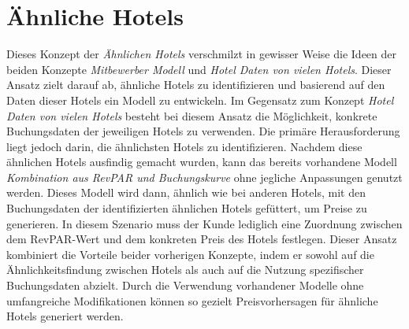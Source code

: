 \section{Ähnliche Hotels}
\label{sec:aehnliche_hotels}
Dieses Konzept der \emph{Ähnlichen Hotels} verschmilzt in gewisser Weise die Ideen der beiden Konzepte \emph{Mitbewerber Modell} und \emph{Hotel Daten von vielen Hotels}. Dieser Ansatz zielt darauf ab, ähnliche Hotels zu identifizieren und basierend auf den Daten dieser Hotels ein Modell zu entwickeln.
\newline
\newline
Im Gegensatz zum Konzept \emph{Hotel Daten von vielen Hotels} besteht bei diesem Ansatz die Möglichkeit, konkrete Buchungsdaten der jeweiligen Hotels zu verwenden. Die primäre Herausforderung liegt jedoch darin, die ähnlichsten Hotels zu identifizieren. Nachdem diese ähnlichen Hotels ausfindig gemacht wurden, kann das bereits vorhandene Modell \emph{Kombination aus RevPAR und Buchungskurve} ohne jegliche Anpassungen genutzt werden.
\newline
\newline
Dieses Modell wird dann, ähnlich wie bei anderen Hotels, mit den Buchungsdaten der identifizierten ähnlichen Hotels gefüttert, um Preise zu generieren. In diesem Szenario muss der Kunde lediglich eine Zuordnung zwischen dem RevPAR-Wert und dem konkreten Preis des Hotels festlegen.
\newline
\newline
Dieser Ansatz kombiniert die Vorteile beider vorherigen Konzepte, indem er sowohl auf die Ähnlichkeitsfindung zwischen Hotels als auch auf die Nutzung spezifischer Buchungsdaten abzielt. Durch die Verwendung vorhandener Modelle ohne umfangreiche Modifikationen können so gezielt Preisvorhersagen für ähnliche Hotels generiert werden.